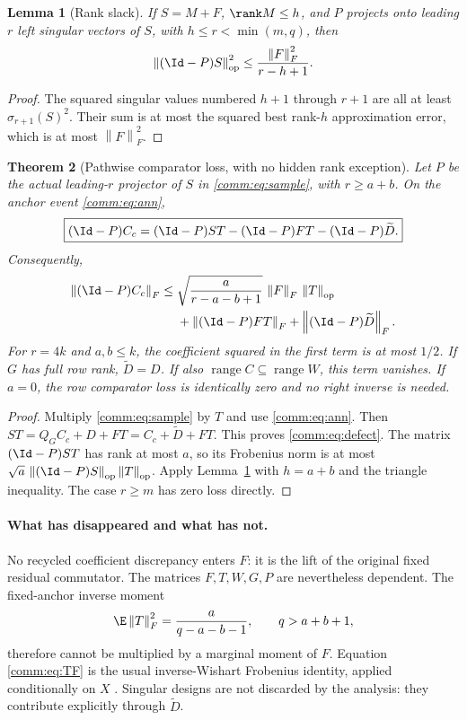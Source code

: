 \documentclass[11pt,oneside,openany,a4paper]{book}
\numberwithin{equation}{chapter}
\newtheorem{theorem}{Theorem}[chapter]
\newtheorem{lemma}[theorem]{Lemma}
\theoremstyle{definition}
\theoremstyle{remark}
\newcommand{\F}[1]{\left\lVert#1\right\rVert_F}
\newcommand{\op}[1]{\left\lVert#1\right\rVert_{\rm op}}
\DeclareMathOperator{\ran}{range}\DeclareMathOperator{\OPT}{OPT}
\begin{document}
\begin{lemma}[Rank slack]\label{comm:lem:slack}
If $S=M+F$, $\rank M\le h$, and $P$ projects onto leading $r$ left singular vectors of $S$, with $h\le r<\min(m,q)$, then
\begin{equation}\label{comm:eq:slack}
 \op{(\Id-P)S}^2\le\frac{\F F^2}{r-h+1}.
\end{equation}
\end{lemma}
\begin{proof}
The squared singular values numbered $h+1$ through $r+1$ are all at least $\sigma_{r+1}(S)^2$. Their sum is at most the squared best rank-$h$ approximation error, which is at most $\F F^2$.
\end{proof}

\begin{theorem}[Pathwise comparator loss, with no hidden rank exception]\label{comm:thm:defect}
Let $P$ be the actual leading-$r$ projector of $S$ in \eqref{comm:eq:sample}, with $r\ge a+b$. On the anchor event \eqref{comm:eq:ann},
\begin{equation}\label{comm:eq:defect}
 \boxed{(\Id-P)C_c=(\Id-P)ST-(\Id-P)FT-(\Id-P)\widetilde D.}
\end{equation}
Consequently,
\begin{equation}\label{comm:eq:defectbound}
 \begin{split}
 \F{(\Id-P)C_c}\le{}&
 \sqrt{\frac{a}{r-a-b+1}}\,\F F\,\op T\\
 &+\F{(\Id-P)FT}+\F{(\Id-P)\widetilde D}.
 \end{split}
\end{equation}
For $r=4k$ and $a,b\le k$, the coefficient squared in the first term is at most $1/2$. If $G$ has full row rank, $\widetilde D=D$. If also $\ran C\subseteq\ran W$, this term vanishes. If $a=0$, the row comparator loss is identically zero and no right inverse is needed.
\end{theorem}
\begin{proof}
Multiply \eqref{comm:eq:sample} by $T$ and use \eqref{comm:eq:ann}. Then
$ST=Q_GC_c+D+FT=C_c+\widetilde D+FT$.
This proves \eqref{comm:eq:defect}. The matrix $(\Id-P)ST$ has rank at most $a$, so its Frobenius norm is at most $\sqrt a\,\op{(\Id-P)S}\op T$. Apply Lemma~\ref{comm:lem:slack} with $h=a+b$ and the triangle inequality. The case $r\ge m$ has zero loss directly.
\end{proof}

\paragraph{What has disappeared and what has not.}
No recycled coefficient discrepancy enters $F$: it is the lift of the original fixed residual commutator. The matrices $F,T,W,G,P$ are nevertheless dependent. The fixed-anchor inverse moment
\begin{equation}\label{comm:eq:TF}
 \E\F T^2=\frac{a}{q-a-b-1},\qquad q>a+b+1,
\end{equation}
therefore cannot be multiplied by a marginal moment of $F$. Equation \eqref{comm:eq:TF} is the usual inverse-Wishart Frobenius identity, applied conditionally on $X$ \cite{HMT}. Singular designs are not discarded by the analysis: they contribute explicitly through $\widetilde D$.
\end{document}
